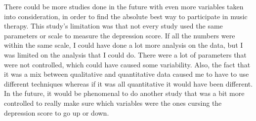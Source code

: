 \documentclass[12pt, titlepage]{article}
\begin{document}
 There could be more studies done in the future with even more variables taken into consideration, in order to find the absolute best way to participate in music therapy. This study’s limitation was that not every study used the same parameters or scale to measure the depression score. If all the numbers were within the same scale, I could have done a lot more analysis on the data, but I was limited on the analysis that I could do. There were a lot of parameters that were not controlled, which could have caused some variability. Also, the fact that it was a mix between qualitative and quantitative data caused me to have to use different techniques whereas if it was all quantitative it would have been different. In the future, it would be phenomenal to do another study that was a bit more controlled to really make sure which variables were the ones cursing the depression score to go up or down.
 \newpage

 
 {}
\end{document}
